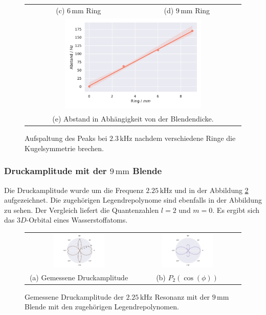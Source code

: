 \begin{figure}[H]
\begin{tabular}{cc}
  (c)  $6 \,\si{\milli\metre}$ Ring & (d)  $9 \,\si{\milli\metre}$ Ring \\[6pt]
  \multicolumn{2}{c}{\includegraphics[width=0.65\textwidth]{Daten/Wasserstoff/spaltGesamt.pdf}}\\[6pt]
  \multicolumn{2}{c}{(e) Abstand in Abhängigkeit von der Blendendicke.}
  \end{tabular}
  \caption{Aufspaltung des Peaks bei $2.3 \,\si{\kilo\hertz}$ nachdem verschiedene Ringe die Kugelsymmetrie brechen.} 
  \label{fig:hspalt}
\end{figure}
\subsubsection{Druckamplitude mit der $9 \,\si{\milli\metre}$ Blende}
Die Druckamplitude wurde um die Frequenz $2.25 \,\si{\kilo\hertz}$ und in der Abbildung \ref{fig:9mm} aufgezeichnet. Die zugehörigen Legendrepolynome sind ebenfalls in der Abbildung zu sehen. Der Vergleich liefert die Quantenzahlen 
$l = 2 $ und $m=0$. Es ergibt sich das $3D$-Orbital eines Wasserstoffatoms.
\begin{figure}[H]
  \centering
  \begin{tabular}{cc}
    \includegraphics[width=0.5\textwidth]{Daten/Wasserstoff/peak9mm.pdf} &   \includegraphics[width=0.5\textwidth]{Daten/Wasserstoff/peakLeg1.pdf} \\
  (a) Gemessene Druckamplitude & (b) $P_2(\cos(\phi))$ \\[6pt]
  \end{tabular}
  \caption{Gemessene Druckamplitude der $2.25 \,\si{\kilo\hertz}$ Resonanz mit der $9 \,\si{\milli\metre}$ Blende mit den zugehörigen Legendrepolynomen.} 
  \label{fig:9mm}
\end{figure}
